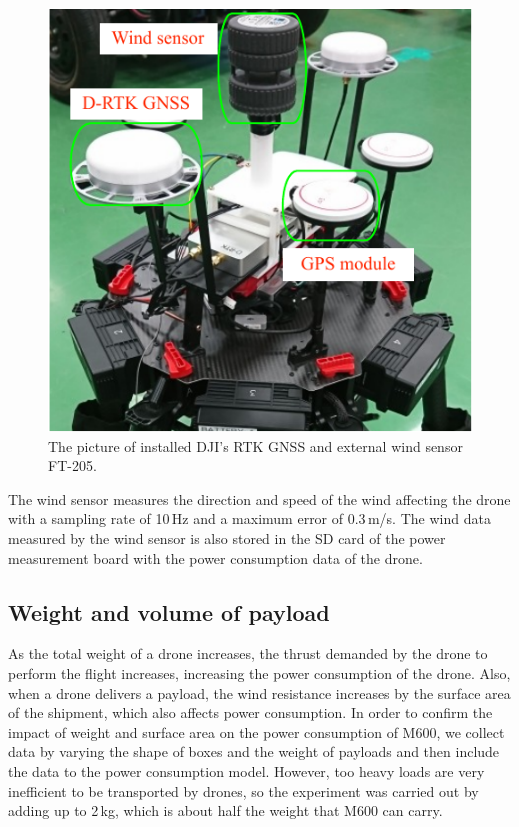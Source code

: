 \documentclass[journal]{./template/IEEEtran}
\begin{document}
\begin{figure}[ht]
\centering\includegraphics[scale=0.95]{fig5/wind_sensor.pdf}
\caption{The picture of installed DJI's RTK GNSS and external wind sensor FT-205.}
\label{fig:wind_sensor}
\end{figure}

The wind sensor measures the direction and speed of the wind affecting the drone with a sampling rate of 10\,Hz and a maximum error of 0.3\,m/s.
The wind data measured by the wind sensor is also stored in the SD card of the power measurement board with the power consumption data of the drone.




\subsection{Weight and volume of payload}

As the total weight of a drone increases, the thrust demanded by the drone to perform the flight increases, increasing the power consumption of the drone. 
Also, when a drone delivers a payload, the wind resistance increases by the surface area of the shipment, which also affects power consumption.
In order to confirm the impact of weight and surface area on the power consumption of M600, we collect data by varying the shape of boxes and the weight of payloads and then include the data to the power consumption model.
However, too heavy loads are very inefficient to be transported by drones, so the experiment was carried out by adding up to 2\,kg, which is about half the weight that M600 can carry.
\end{document}
